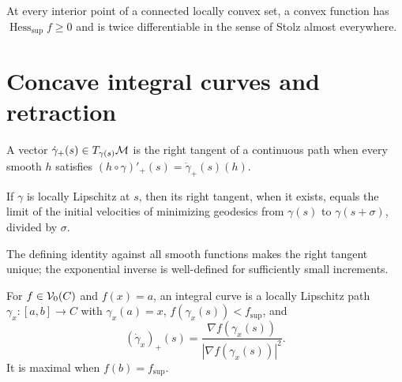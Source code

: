 \begin{lemma}
\label{lem:chow-iii-h39-convex-support-hessian}

At every interior point of a connected locally convex set, a convex function has
$\operatorname{Hess}_{\mathrm{sup}}f\ge0$ and is twice differentiable in the sense of
Stolz almost everywhere.
\end{lemma}

\section{Concave integral curves and retraction}

\begin{definition}
\label{def:chow-iii-h40-right-tangent}
A vector $\dot\gamma_+(s)\in T_{\gamma(s)}\mathcal M$ is the right tangent of a continuous path
when every smooth $h$ satisfies $(h\circ\gamma)'_+(s)=\dot\gamma_+(s)(h)$.
\end{definition}

\begin{lemma}
\label{lem:chow-iii-h41-right-tangent-geodesics}

If $\gamma$ is locally Lipschitz at $s$, then its right tangent, when it exists, equals
the limit of the initial velocities of minimizing geodesics from $\gamma(s)$ to
$\gamma(s+\sigma)$, divided by $\sigma$.
\end{lemma}

\begin{remark}
\label{rem:chow-iii-h42-right-tangent-uniqueness}
The defining identity against all smooth functions makes the right tangent unique;
the exponential inverse is well-defined for sufficiently small increments.
\end{remark}

\begin{definition}
\label{def:chow-iii-h43-integral-curve}
For $f\in\mathcal V_0(C)$ and $f(x)=a$, an integral curve is a locally Lipschitz path
$\gamma_x:[a,b]\to C$ with $\gamma_x(a)=x$, $f(\gamma_x(s))<f_{\sup}$, and
\[
(\dot\gamma_x)_+(s)=\frac{\nabla f(\gamma_x(s))}{|\nabla f(\gamma_x(s))|^2}.
\]
It is maximal when $f(b)=f_{\sup}$.
\end{definition}


